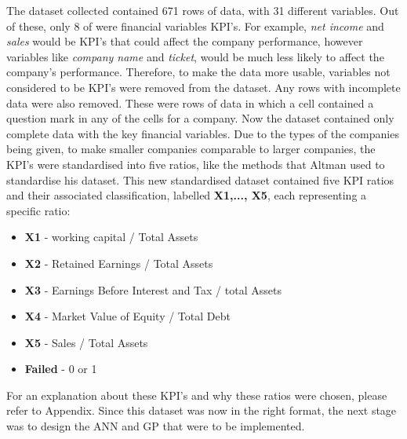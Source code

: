 \documentclass[11pt]{article}
\begin{document}
The dataset collected contained 671 rows of data, with 31 different variables. Out of these, only 8 of were financial variables KPI's. For example, \textit{net income} and \textit{sales} would be KPI's that could affect the company performance, however variables like \textit{company name} and \textit{ticket}, would be much less likely to affect the company's performance. Therefore, to make the data more usable, variables not considered to be KPI's were removed from the dataset. Any rows with incomplete data were also removed. These were rows of data in which a cell contained a question mark in any of the cells for a company. Now the dataset contained only complete data with the key financial variables. Due to the types of the companies being given, to make smaller companies comparable to larger companies, the KPI's were standardised into five ratios, like the methods that Altman used to standardise his dataset. This new standardised dataset contained five KPI ratios and their associated classification, labelled \textbf{X1,..., X5}, each representing a specific ratio:
\begin{center}
	\begin{minipage}{.6\textwidth}
		\begin{itemize}
			\item[] \textbf{X1} - working capital / Total Assets
			\item[] \textbf{X2} - Retained Earnings / Total Assets
			\item[] \textbf{X3} - Earnings Before Interest and Tax / total Assets
			\item[] \textbf{X4} - Market Value of Equity / Total Debt
			\item[] \textbf{X5} - Sales / Total Assets
			\item[] \textbf{Failed} - 0 or 1
		\end{itemize}
	\end{minipage}
\end{center}
For an explanation about these KPI's and why these ratios were chosen, please refer to Appendix\cite{?}.
Since this dataset was now in the right format, the next stage was to design the ANN and GP that were to be implemented. 
\end{document}
